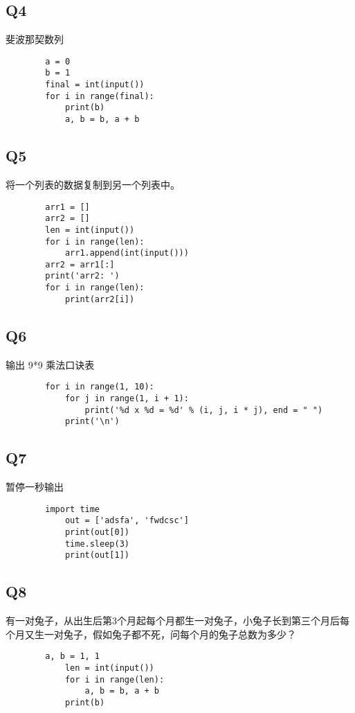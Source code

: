 \documentclass{article}
\begin{document}
    \subsection{Q4}
    斐波那契数列
    \begin{verbatim}
        a = 0
        b = 1
        final = int(input())
        for i in range(final):
            print(b)
            a, b = b, a + b
    \end{verbatim}

    \subsection{Q5}
    将一个列表的数据复制到另一个列表中。
    \begin{verbatim}
        arr1 = []
        arr2 = []
        len = int(input())
        for i in range(len):
            arr1.append(int(input()))
        arr2 = arr1[:]
        print('arr2: ')
        for i in range(len):
            print(arr2[i])
    \end{verbatim}
    
    \subsection{Q6}
    输出 9*9 乘法口诀表
    \begin{verbatim}
        for i in range(1, 10):
            for j in range(1, i + 1):
                print('%d x %d = %d' % (i, j, i * j), end = " ")
            print('\n')
    \end{verbatim}

    \subsection{Q7}
    暂停一秒输出
    \begin{verbatim}
        import time
            out = ['adsfa', 'fwdcsc']
            print(out[0])
            time.sleep(3)
            print(out[1])
    \end{verbatim}

    \subsection{Q8}
    有一对兔子，从出生后第3个月起每个月都生一对兔子，小兔子长到第三个月后每个月又生一对兔子，假如兔子都不死，问每个月的兔子总数为多少？
    \begin{verbatim}
        a, b = 1, 1
            len = int(input())
            for i in range(len):
                a, b = b, a + b
            print(b)
    \end{verbatim}
\end{document}
